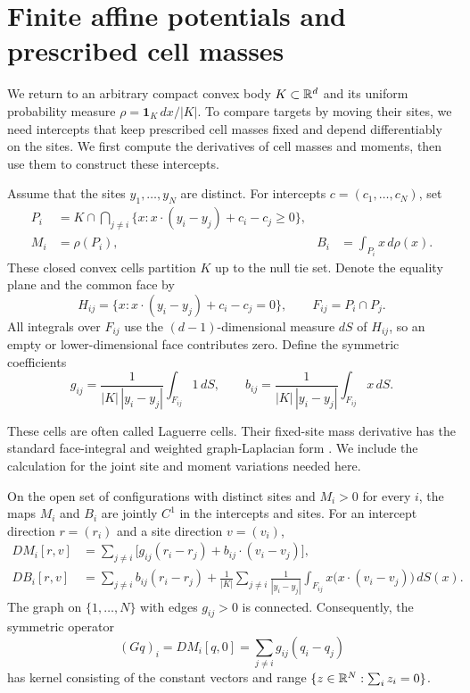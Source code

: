 \section{Finite affine potentials and prescribed cell masses}
\label{sec:cells}

We return to an arbitrary compact convex body $K\subset\mathbb R^d$ and its
uniform probability measure $\rho=\mathbf 1_K\,dx/|K|$. To compare targets
by moving their sites, we need intercepts that keep prescribed cell masses
fixed and depend differentiably on the sites. We first compute the derivatives
of cell masses and moments, then use them to construct these intercepts.

Assume that the sites $y_1,\ldots,y_N$ are distinct. For intercepts
$c=(c_1,\ldots,c_N)$, set
\begin{align*}
 P_i&=K\cap\bigcap_{j\ne i}
 \{x:x\cdot(y_i-y_j)+c_i-c_j\ge0\},\\
 M_i&=\rho(P_i),
 &B_i&=\int_{P_i}x\,d\rho(x).
\end{align*}
These closed convex cells partition $K$ up to the null tie set. Denote the
equality plane and the common face by
\[
 H_{ij}=\{x:x\cdot(y_i-y_j)+c_i-c_j=0\},
 \qquad F_{ij}=P_i\cap P_j.
\]
All integrals over $F_{ij}$ use the $(d-1)$-dimensional measure $dS$ of
$H_{ij}$, so an empty or lower-dimensional face contributes zero. Define
the symmetric coefficients
\begin{equation}
\label{cells:face-coefficients}
 g_{ij}=\frac{1}{|K|\,|y_i-y_j|}\int_{F_{ij}}1\,dS,
 \qquad
 b_{ij}=\frac{1}{|K|\,|y_i-y_j|}\int_{F_{ij}}x\,dS.
\end{equation}

These cells are often called Laguerre cells. Their fixed-site mass
derivative has the standard face-integral and weighted graph-Laplacian
form \cite[Theorem~1.3 and Section~5.3]{KitagawaMerigotThibert2019}.
We include the calculation for the joint site and moment variations
needed here.

\begin{proposition}
\label{cells:calculus}
On the open set of configurations with distinct sites and $M_i>0$ for
every $i$, the maps $M_i$ and $B_i$ are jointly $C^1$ in the intercepts and
sites. For an intercept direction $r=(r_i)$ and a site direction
$v=(v_i)$,
\begin{align}
 D M_i[r,v]
 &=\sum_{j\ne i}\bigl[g_{ij}(r_i-r_j)
          +b_{ij}\cdot(v_i-v_j)\bigr],
 \label{cells:mass-differential}\\
 D B_i[r,v]
 &=\sum_{j\ne i}b_{ij}(r_i-r_j)
   +\frac1{|K|}\sum_{j\ne i}\frac1{|y_i-y_j|}
        \int_{F_{ij}}x\bigl(x\cdot(v_i-v_j)\bigr)\,dS(x).
 \label{cells:moment-differential}
\end{align}
The graph on $\{1,\ldots,N\}$ with edges $g_{ij}>0$ is connected.
Consequently, the symmetric operator
\begin{equation}
\label{cells:laplacian}
 (Gq)_i=D M_i[q,0]=\sum_{j\ne i}g_{ij}(q_i-q_j)
\end{equation}
has kernel consisting of the constant vectors and range
$\{z\in\mathbb R^N:\sum_i z_i=0\}$.
\end{proposition}

